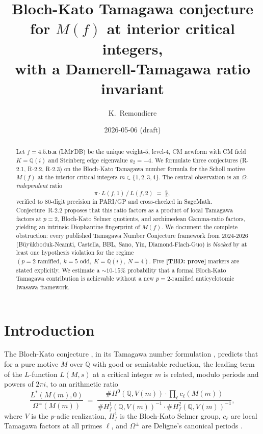 \documentclass[12pt]{amsart}
\theoremstyle{definition}
\newcommand{\Q}{\mathbb{Q}}
\begin{document}
\title{Bloch-Kato Tamagawa conjecture for $M(f)$ at interior critical integers,\\
with a Damerell-Tamagawa ratio invariant}

\author{K.~Remondiere}
\address{Independent researcher, affiliated with crossed-cosmos ECI project}

\date{2026-05-06 (draft)}

\begin{abstract}
Let $f = \mathbf{4.5.b.a}$ (LMFDB) be the unique weight-$5$, level-$4$, CM newform
with CM field $K = \Q(i)$ and Steinberg edge eigenvalue $a_2 = -4$.
We formulate three conjectures (R-2.1, R-2.2, R-2.3)
on the Bloch-Kato Tamagawa number formula for the Scholl motive
$M(f)$ at the interior critical integers $m \in \{1,2,3,4\}$.
The central observation is an $\Omega$-\emph{independent} ratio
\[
  \pi \cdot L(f,1) \,/\, L(f,2) \;=\; \tfrac{6}{5},
\]
verified to 80-digit precision in PARI/GP and cross-checked in SageMath.
Conjecture~R-2.2 proposes that this ratio factors as a product of
local Tamagawa factors at $p = 2$, Bloch-Kato Selmer quotients, and archimedean
Gamma-ratio factors, yielding an intrinsic Diophantine fingerprint of $M(f)$.
We document the complete obstruction: every published Tamagawa Number Conjecture
framework from 2024-2026 (Büyükboduk-Neamti, Castella, BBL, Sano, Yin,
Diamond-Flach-Guo) is \emph{blocked} by at least one hypothesis violation for the
regime $(p=2 \text{ ramified},\ k=5 \text{ odd},\ K=\Q(i),\ N=4)$.
Five \textbf{[TBD: prove]} markers are stated explicitly.
We estimate a $\sim 10$-$15\%$ probability that a formal Bloch-Kato Tamagawa
contribution is achievable without a new $p=2$-ramified anticyclotomic Iwasawa
framework.
\end{abstract}

\maketitle

\tableofcontents

\section{Introduction}
\label{sec:intro}

The Bloch-Kato conjecture \cite{BK90}, in its Tamagawa number formulation
\cite{FPR94}, predicts that for a pure motive $M$ over $\Q$ with
good or semistable reduction, the leading term of the $L$-function $L(M,s)$
at a critical integer $m$ is related, modulo periods and powers of $2\pi i$,
to an arithmetic ratio
\begin{equation}\label{eq:BK}
  \frac{L^*(M(m),0)}{\Omega^\pm(M(m))}
  \;=\;
  \frac{\#H^0(\Q, V(m)) \cdot \prod_\ell c_\ell(M(m))}{\#H^1_f(\Q, V(m))^{-1} \cdot \#H^2_f(\Q, V(m))^{-1}},
\end{equation}
where $V$ is the $p$-adic realization, $H^1_f$ is the Bloch-Kato Selmer group,
$c_\ell$ are local Tamagawa factors at all primes $\ell$, and $\Omega^\pm$
are Deligne's canonical periods \cite{Del79}.
\end{document}
